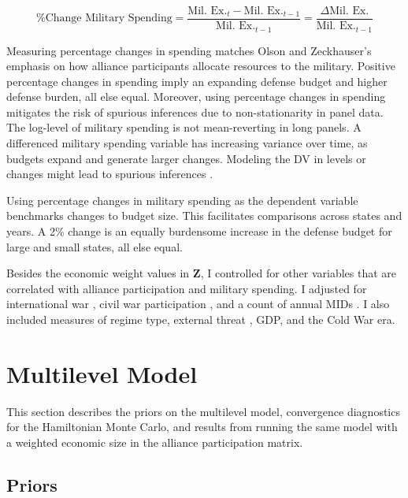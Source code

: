 \documentclass[12pt]{article}
\begin{document}
\begin{equation}
\mbox{\% Change Military Spending} = \frac{\mbox{Mil. Ex.}_t - \mbox{Mil. Ex.}_{t-1} }{ \mbox{Mil. Ex.}_{t-1} } = \frac{\Delta \mbox{Mil. Ex.} }{ \mbox{Mil. Ex.}_{t-1} }
\end{equation} 


Measuring percentage changes in spending matches Olson and Zeckhauser's emphasis on how alliance participants allocate resources to the military.
Positive percentage changes in spending imply an expanding defense budget and higher defense burden, all else equal.
Moreover, using percentage changes in spending mitigates the risk of spurious inferences due to non-stationarity in panel data. 
The log-level of military spending is not mean-reverting in long panels.
A differenced military spending variable has increasing variance over time, as budgets expand and generate larger changes. 
Modeling the DV in levels or changes might lead to spurious inferences \citep{GrangerNewbold1974}. 


Using percentage changes in military spending as the dependent variable benchmarks changes to budget size. 
This facilitates comparisons across states and years. 
A 2\% change is an equally burdensome increase in the defense budget for large and small states, all else equal. 


Besides the economic weight values in \textbf{Z}, I controlled for other variables that are correlated with alliance participation and military spending. 
I adjusted for international war \citep{Reiteretal2016}, civil war participation \citep{SarkeesWayman2010}, and a count of annual MIDs \citep{Gibleretal2016}. 
I also included measures of regime type, external threat \citep{LeedsSavun2007}, GDP, and the Cold War era. 

 


\section{Multilevel Model}

This section describes the priors on the multilevel model, convergence diagnostics for the Hamiltonian Monte Carlo, and results from running the same model with a weighted economic size in the alliance participation matrix. 


\subsection{Priors} 
\end{document}
